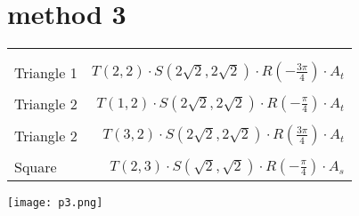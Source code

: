 \documentclass[a4paper,10pt]{article} %
\begin{document}
\section{method 3}{
	\begin{multicols}{2}
		{\large
		\begin{tabular}{l|r}
		\multicolumn{2}{c}{}\\
		\multicolumn{2}{c}{}\\
		Triangle 1& $T(2,2) \cdot S(2\sqrt{2},2\sqrt{2}) \cdot R(-\frac{3\pi}{4}) \cdot A_t $\\ \multicolumn{2}{c}{}\\
		Triangle 2& $T(1,2) \cdot S(2\sqrt{2},2\sqrt{2}) \cdot R(-\frac{\pi}{4}) \cdot A_t $\\ \multicolumn{2}{c}{}\\
		Triangle 2& $T(3,2) \cdot S(2\sqrt{2},2\sqrt{2}) \cdot R(\frac{3\pi}{4}) \cdot A_t $\\ \multicolumn{2}{c}{}\\
		Square& $T(2,3) \cdot S(\sqrt{2},\sqrt{2}) \cdot R(-\frac{\pi}{4}) \cdot A_s $\\
		\end{tabular}
		}
	\columnbreak
	\hfill \texttt{[image: p3.png]}
	\end{multicols}
}
\end{document}

